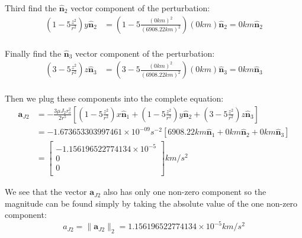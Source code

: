 \documentclass[titlepage]{article}
\begin{document}
Third find the $\boldsymbol{\hat{n}}_2$ vector component of the perturbation:
\begin{equation}
	\begin{split}
		\left(1-5\frac{z^2}{r^2}\right)y\hat{\boldsymbol{n}}_2&=\left(1-5\frac{(0km)^2}{(6908.22km)^2}\right)(0km)\hat{\boldsymbol{n}}_2=0km\hat{\boldsymbol{n}}_2\\
	\end{split}
\end{equation}

Finally find the $\boldsymbol{\hat{n}}_3$ vector component of the perturbation:
\begin{equation}
	\begin{split}
		\left(3-5\frac{z^2}{r^2}\right)z\hat{\boldsymbol{n}}_3&=\left(3-5\frac{(0km)^2}{(6908.22km)^2}\right)(0km)\hat{\boldsymbol{n}}_3=0km\hat{\boldsymbol{n}}_3\\
	\end{split}
\end{equation}

Then we plug these components into the complete equation:
\begin{equation}
	\begin{split}
		\boldsymbol{a}_{J2} &= -\frac{3\mu J_2 r_o^2}{2r^5}\left[\left(1-5\frac{z^2}{r^2}\right)x\hat{\boldsymbol{n}}_1 + \left(1-5\frac{z^2}{r^2}\right)y\hat{\boldsymbol{n}}_2 + \left(3-5\frac{z^2}{r^2}\right)z\hat{\boldsymbol{n}}_3\right]\\
		&=-1.673653303997461\times 10^{-09 }s^{-2}\left[6908.22km\hat{\boldsymbol{n}}_1+0km\hat{\boldsymbol{n}}_2+0km\hat{\boldsymbol{n}}_3\right]\\
		&=\begin{bmatrix}
			-1.156196522774134\times10^{-5} \\
			0 \\
			0 \\
		\end{bmatrix}km/s^2
	\end{split}
\end{equation}

\begin{mdframed}[linewidth=1pt, innertopmargin=10pt, innerbottommargin=10pt]
	We see that the vector $\boldsymbol{a}_{J2}$ also has only one non-zero component so the magnitude can be found simply by taking the absolute value of the one non-zero component:
	\begin{equation}
		a_{J2} = \|\boldsymbol{a}_{J2}\|_2=1.156196522774134\times10^{-5}km/s^2
	\end{equation}
\end{mdframed}
\end{document}
